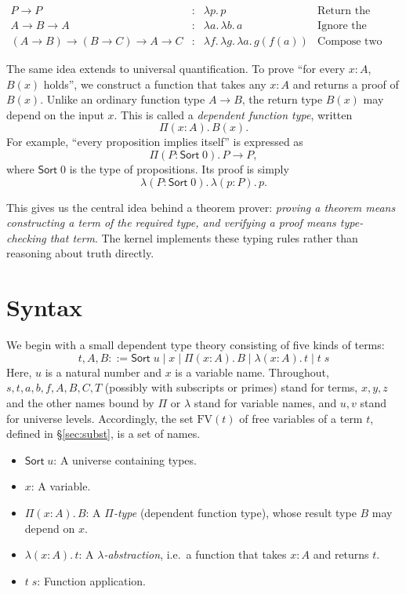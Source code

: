 \documentclass[acmsmall,screen,nonacm]{acmart}
\newcommand{\Sort}[1]{\mathsf{Sort}\;#1}
\newcommand{\tPi}[3]{\Pi(#1{:}#2).\,#3}
\newcommand{\tLam}[3]{\lambda(#1{:}#2).\,#3}
\newcommand{\FV}{\mathrm{FV}}
\begin{document}
\[
\begin{array}{rcll}
P \to P
&:& \lambda p.\,p
& \text{Return the assumption.}\\[4pt]
A \to B \to A
&:& \lambda a.\,\lambda b.\,a
& \text{Ignore the second argument.}\\[4pt]
(A \to B) \to (B \to C) \to A \to C
&:& \lambda f.\,\lambda g.\,\lambda a.\,g(f(a))
& \text{Compose two functions.}
\end{array}
\]

The same idea extends to universal quantification.
To prove ``for every $x : A$, $B(x)$ holds'', we construct a function
that takes any $x : A$ and returns a proof of $B(x)$. Unlike an ordinary function type $A \to B$, the return type $B(x)$
may depend on the input $x$. This is called a \emph{dependent function type},
written
\[
\Pi(x : A).\,B(x).
\]
For example, ``every proposition implies itself'' is expressed as
\[
\tPi{P}{\Sort{0}}{P \to P},
\]
where $\Sort{0}$ is the type of propositions. Its proof is simply
\[
\tLam{P}{\Sort{0}}{\tLam{p}{P}{p}}.
\]

This gives us the central idea behind a theorem prover:
\emph{proving a theorem means constructing a term of the required type,
and verifying a proof means type-checking that term}.
The kernel implements these typing rules rather than reasoning about
truth directly.

\section{Syntax}
\label{sec:syntax}

We begin with a small dependent type theory consisting of five kinds of terms:
\[
t, A, B ::= \Sort{u} \mid x \mid \tPi{x}{A}{B} \mid \tLam{x}{A}{t} \mid t\;s
\]
Here, $u$ is a natural number and $x$ is a variable name.
Throughout, $s, t, a, b, f, A, B, C, T$ (possibly with subscripts or primes) stand for terms,
$x, y, z$ and the other names bound by $\Pi$ or $\lambda$ stand for variable names, and $u, v$ stand for universe levels.
Accordingly, the set $\FV(t)$ of free variables of a term $t$, defined in \S\ref{sec:subst}, is a set of names.

\begin{itemize}
    \item $\Sort{u}$: A universe containing types.
    \item $x$: A variable.
    \item $\tPi{x}{A}{B}$: A \emph{$\Pi$-type} (dependent function type), whose result type $B$ may depend on $x$.
    \item $\tLam{x}{A}{t}$: A \emph{$\lambda$-abstraction}, i.e.\ a function that takes $x : A$ and returns $t$.
    \item $t\;s$: Function application.
\end{itemize}
\end{document}
